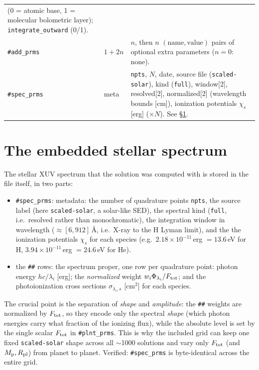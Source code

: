 \documentclass[english,a4paper]{my_memo}
\newcommand{\Rp}{\ensuremath{R_{\rm pl}}}
\newcommand{\code}[1]{\texttt{#1}}
\newcommand{\Ftot}{\ensuremath{F_{\rm tot}}}
\newcommand{\hd}[1]{\code{\##1}}      %
\begin{document}
\begin{table}[t]
\begin{tabular}{@{}l l p{8.4cm}@{}}
                     (0 = atomic base, 1 = molecular bolometric layer);
                     \code{integrate\_outward} (0/1). \\
\hd{add\_prms} & $1{+}2n$ & $n$, then $n$ $(\text{name},\text{value})$ pairs
                     of optional extra parameters ($n=0$: none). \\
\hd{spec\_prms}& meta & \code{npts}, $N$, date, source file
                     (\code{scaled-solar}), kind (\code{full}),
                     window[2], resolved[2], normalized[2] (wavelength
                     bounds [cm]), ionization potentials $\chi_s$ [erg]
                     ($\times N$). See \S\ref{sec:spec}. \\
\bottomrule
\end{tabular}
\end{table}

\section{The embedded stellar spectrum}
\label{sec:spec}
The stellar XUV spectrum that the solution was computed with is stored in
the file itself, in two parts:
\begin{itemize}\itemsep2pt
  \item \hd{spec\_prms}: metadata: the number of quadrature points
        \code{npts}, the source label (here \code{scaled-solar}, a
        solar-like SED), the spectral kind (\code{full}, i.e.\ resolved
        rather than monochromatic), the integration window in wavelength
        ($\approx[6,912]\,$\AA, i.e.\ X-ray to the H Lyman limit), and the
        the ionization potentials $\chi_s$ for each species (e.g.\
        $2.18\times10^{-11}\,$erg $=13.6$\,eV for H,
        $3.94\times10^{-11}\,$erg $=24.6$\,eV for He).
  \item the \code{\#\#} rows: the spectrum proper, one row per
        quadrature point: photon energy $hc/\lambda_i$ [erg]; the
        \emph{normalized} weight $w_i\Phi_{\lambda_i}/\Ftot$; and the
        photoionization cross sections $\sigma_{\lambda_i,s}$ [cm$^2$] for
        each species.
\end{itemize}
The crucial point is the separation of \emph{shape} and \emph{amplitude}:
the \code{\#\#} weights are normalized by $\Ftot$, so they encode only the
spectral \emph{shape} (which photon energies carry what fraction of the
ionizing flux), while the absolute level is set by the single scalar
$\Ftot$ in \hd{plnt\_prms}. This is why the included grid can keep one fixed
\code{scaled-solar} shape across all $\sim$1000 solutions and vary only
$\Ftot$ (and $M_{\rm p},\Rp$) from planet to planet. Verified: \hd{spec\_prms}
is byte-identical across the entire grid.
\end{document}
